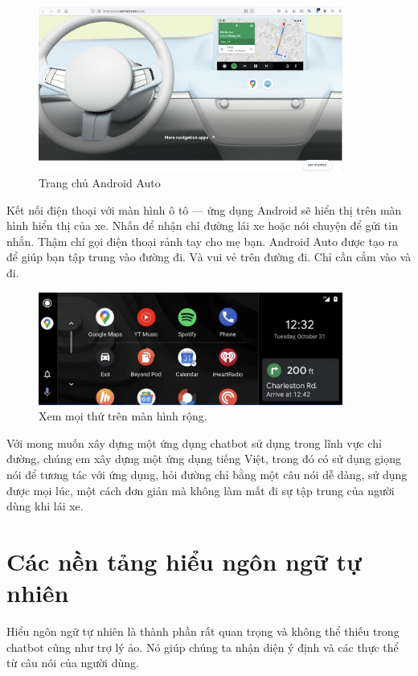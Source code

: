 \begin{figure}[H]
    \centering
    \includegraphics[width=10cm]{images/Android-Auto.png}
    \caption{Trang chủ Android Auto}
    \label{fig:homepage-android-auto}
\end{figure}

Kết nối điện thoại với màn hình ô tô — ứng dụng Android sẽ hiển thị trên màn hình hiển thị của xe. Nhấn để nhận chỉ đường lái xe hoặc nói chuyện để gửi tin nhắn. Thậm chí gọi điện thoại rảnh tay cho mẹ bạn. Android Auto được tạo ra để giúp bạn tập trung vào đường đi. Và vui vẻ trên đường đi. Chỉ cần cắm vào và đi.

\begin{figure}[H]
    \centering
    \includegraphics[width=10cm]{images/widescreen.png}
    \caption{Xem mọi thứ trên màn hình rộng.}
    \label{fig:homepage-widescreen-Android}
\end{figure}

Với mong muốn xây dựng một ứng dụng chatbot sử dụng trong lĩnh vực chỉ đường, chúng em xây dựng một ứng dụng tiếng Việt, trong đó có sử dụng giọng nói để tương tác với ứng dụng, hỏi đường chỉ bằng một câu nói dễ dàng, sử dụng được mọi lúc, một cách đơn giản mà không làm mất đi sự tập trung của người dùng khi lái xe.

\section{Các nền tảng hiểu ngôn ngữ tự nhiên}

Hiểu ngôn ngữ tự nhiên là thành phần rất quan trọng và không thể thiếu trong chatbot cũng như trợ lý ảo. Nó giúp chúng ta nhận diện ý định và các thực thể từ câu nói của người dùng.

